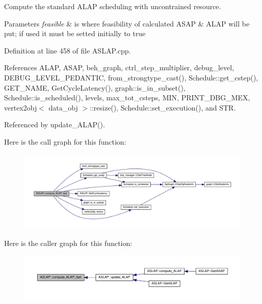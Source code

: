 Compute the standard A\+L\+AP scheduling with uncontrained resource. 


\begin{DoxyParams}{Parameters}
{\em feasible} & is where feasibility of calculated A\+S\+AP \& A\+L\+AP will be put; if used it must be setted initially to true \\
\hline
\end{DoxyParams}


Definition at line 458 of file A\+S\+L\+A\+P.\+cpp.



References A\+L\+AP, A\+S\+AP, beh\+\_\+graph, ctrl\+\_\+step\+\_\+multiplier, debug\+\_\+level, D\+E\+B\+U\+G\+\_\+\+L\+E\+V\+E\+L\+\_\+\+P\+E\+D\+A\+N\+T\+IC, from\+\_\+strongtype\+\_\+cast(), Schedule\+::get\+\_\+cstep(), G\+E\+T\+\_\+\+N\+A\+ME, Get\+Cycle\+Latency(), graph\+::is\+\_\+in\+\_\+subset(), Schedule\+::is\+\_\+scheduled(), levels, max\+\_\+tot\+\_\+csteps, M\+IN, P\+R\+I\+N\+T\+\_\+\+D\+B\+G\+\_\+\+M\+EX, vertex2obj$<$ data\+\_\+obj $>$\+::resize(), Schedule\+::set\+\_\+execution(), and S\+TR.



Referenced by update\+\_\+\+A\+L\+A\+P().

Here is the call graph for this function\+:
\nopagebreak
\begin{figure}[H]
\begin{center}
\leavevmode
\includegraphics[width=350pt]{d9/d2a/classASLAP_a6baa077e9e86116db4997b1a65e891fc_cgraph}
\end{center}
\end{figure}
Here is the caller graph for this function\+:
\nopagebreak
\begin{figure}[H]
\begin{center}
\leavevmode
\includegraphics[width=350pt]{d9/d2a/classASLAP_a6baa077e9e86116db4997b1a65e891fc_icgraph}
\end{center}
\end{figure}
\mbox{\label{classASLAP_a159cf9d0fbd60dcd9c4ba2912ea4405e}} 
